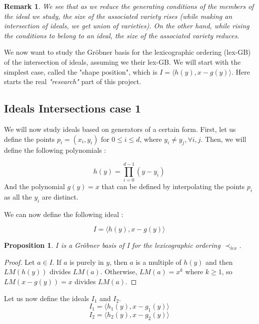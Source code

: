 \documentclass{article}
\newtheorem{proposition}{Proposition}[section]
\newtheorem{remark}{Remark}[section]
\begin{document}
\begin{remark}
    We see that as we \textit{reduce} the generating conditions of the members of the ideal we study, the size of the associated variety rises (while making an intersection of ideals, we get union of varieties). On the other hand, while rising the conditions to belong to an ideal, the size of the associated variety reduces.
\end{remark}

We now want to study the Gröbner basis for the lexicographic ordering (lex-GB) of the intersection of ideals, assuming we their lex-GB.
We will start with the simplest case, called the "shape position", which is $I = \langle h(y), x - g(y) \rangle$. Here starts the real \textit{"research"} part of this project. \\

\subsection*{Ideals Intersections case 1}

We will now study ideals based on generators of a certain form. 
First, let us define the points $p_{i} = (x_{i}, y_{i})$ for $0 \leq i \leq d$, where $y_{i} \neq y_{j}, \forall i, j$. 
Then, we will define the following polynomials : 

\begin{displaymath}
    h(y) = \prod_{i=0}^{d-1} (y - y_{i}) 
\end{displaymath}
And the polynomial $g(y) = x$ that can be defined by interpolating the points $p_{i}$ as all the $y_{i}$ are distinct. 

We can now define the following ideal : 

\begin{displaymath}
    I = \langle h(y), x - g(y) \rangle
\end{displaymath}

\begin{proposition}
    $I$ is a Gröbner basis of I for the lexicographic ordering $\prec_{lex}$.  
\end{proposition}

\begin{proof}
    Let $a \in I$. If $a$ is purely in $y$, then $a$ is a multiple of $h(y)$ and then $LM(h(y))$ divides $LM(a)$. Otherwise, $LM(a) = x^{k}$ where $k \geq 1$, so $LM(x - g(y)) = x$ divides $LM(a)$.
\end{proof}

Let us now define the ideals $I_{1}$ and $I_{2}$. 
\begin{displaymath}
    I_{1} = \langle h_{1}(y), x - g_{1}(y) \rangle
\end{displaymath}
\begin{displaymath}
    I_{2} = \langle h_{2}(y), x - g_{2}(y) \rangle
\end{displaymath}
\end{document}
